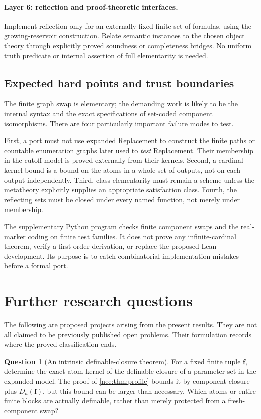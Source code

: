 \documentclass[11pt,letterpaper]{article}
\numberwithin{equation}{section}
\theoremstyle{plain}
\theoremstyle{definition}
\newtheorem{question}[question]{Question}
\theoremstyle{remark}
\begin{document}
\paragraph{Layer 6: reflection and proof-theoretic interfaces.}
Implement reflection only for an externally fixed finite set of formulas, using the growing-reservoir construction. Relate semantic instances to the chosen object theory through explicitly proved soundness or completeness bridges. No uniform truth predicate or internal assertion of full elementarity is needed.

\subsection{Expected hard points and trust boundaries}
The finite graph swap is elementary; the demanding work is likely to be the internal syntax and the exact specifications of set-coded component isomorphisms. There are four particularly important failure modes to test.

First, a port must not use expanded Replacement to construct the finite paths or countable enumeration graphs later used to \emph{test} Replacement. Their membership in the cutoff model is proved externally from their kernels. Second, a cardinal-kernel bound is a bound on the atoms in a whole set of outputs, not on each output independently. Third, class elementarity must remain a scheme unless the metatheory explicitly supplies an appropriate satisfaction class. Fourth, the reflecting sets must be closed under every named function, not merely under membership.

The supplementary Python program checks finite component swaps and the real-marker coding on finite test families. It does not prove any infinite-cardinal theorem, verify a first-order derivation, or replace the proposed Lean development. Its purpose is to catch combinatorial implementation mistakes before a formal port.

\section{Further research questions}\label{nee:sec:questions}

The following are proposed projects arising from the present results. They are not all claimed to be previously published open problems. Their formulation records where the proved classification ends.

\begin{question}[An intrinsic definable-closure theorem]\label{nee:q:dcl}
For a fixed finite tuple $\boldsymbol f$, determine the exact atom kernel of the definable closure of a parameter set in the expanded model. The proof of \cref{nee:thm:profile} bounds it by component closure plus $D_\kappa(\boldsymbol f)$, but this bound can be larger than necessary. Which atoms or entire finite blocks are actually definable, rather than merely protected from a fresh-component swap?
\end{question}
\end{document}
